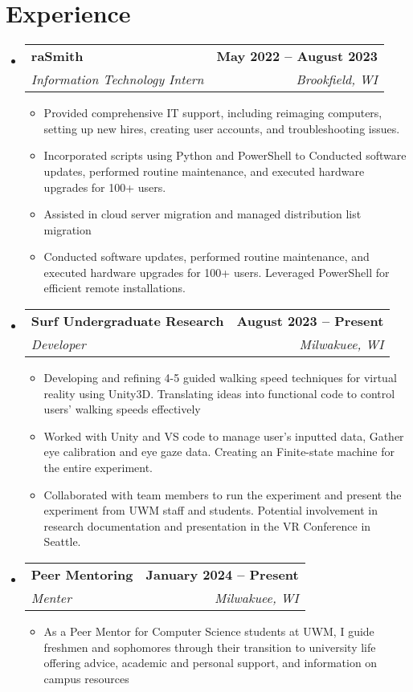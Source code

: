 \documentclass[letterpaper,11pt]{article}
\makeatletter
\newcommand{\resumeItem}[1]{
  \item\small{
    {#1 \vspace{-2pt}}
  }
}
\newcommand{\resumeSubheading}[4]{
  \vspace{-2pt}\item
    \begin{tabular*}{1.0\textwidth}[t]{l@{\extracolsep{\fill}}r}
      \textbf{#1} & \textbf{\small #2} \\
      \textit{\small#3} & \textit{\small #4} \\
    \end{tabular*}\vspace{-7pt}
}
\newcommand{\resumeSubHeadingListStart}{\begin{itemize}[leftmargin=0.0in, label={}]}
\newcommand{\resumeSubHeadingListEnd}{\end{itemize}}
\newcommand{\resumeItemListStart}{\begin{itemize}}
\newcommand{\resumeItemListEnd}{\end{itemize}\vspace{-5pt}}
\makeatother
\begin{document}
\section{Experience}
  \resumeSubHeadingListStart

    \resumeSubheading
      {raSmith}{May 2022 -- August 2023}
      {Information Technology Intern}{Brookfield, WI}
      \resumeItemListStart
        \resumeItem{ Provided comprehensive IT support, including reimaging computers, setting up new hires, creating 
        user accounts, and troubleshooting issues.}
        \resumeItem{Incorporated scripts using Python and PowerShell to Conducted software updates, performed routine maintenance, and executed hardware upgrades for 
        100+ users.}
        \resumeItem{Assisted in cloud server migration and managed distribution list migration}
        \resumeItem{Conducted software updates, performed routine maintenance, and executed hardware upgrades for 
        100+ users. Leveraged PowerShell for efficient remote installations.}
      \resumeItemListEnd

    \resumeSubheading
      {Surf Undergraduate Research}{August 2023 -- Present}
      {Developer}{Milwakuee, WI}
      \resumeItemListStart
        \resumeItem{Developing and refining 4-5 guided walking speed techniques for virtual reality using Unity3D. Translating ideas into functional code to control users' walking speeds effectively}
        \resumeItem{Worked with Unity and VS code to manage user's inputted data, Gather eye calibration and eye gaze data. Creating an Finite-state machine for the entire experiment. }
        \resumeItem{Collaborated with team members to run the experiment and present the experiment from UWM staff and students. Potential involvement in research documentation and presentation in the VR Conference in Seattle.}
        \resumeItemListEnd
    
    \resumeSubheading
      {Peer Mentoring }{January 2024 -- Present}
      {Menter}{Milwakuee, WI}
      \resumeItemListStart
        \resumeItem{As a Peer Mentor for Computer Science students at UWM, I guide freshmen and sophomores 
        through their transition to university life offering advice, academic and personal support, and 
        information on campus resources}
        \resumeItemListEnd
  \resumeSubHeadingListEnd
\vspace{-16pt}

\end{document}

